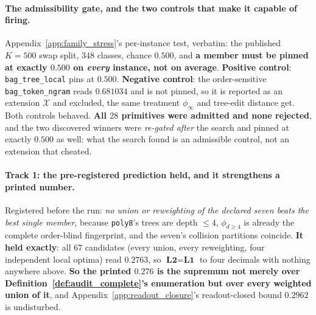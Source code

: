 \paragraph{The admissibility gate, and the two controls that make it capable of firing.} Appendix~\ref{app:family_stress}'s per-instance test, verbatim: the published $K{=}500$ swap split, $348$ classes, chance $0.500$, and \textbf{a member must be pinned at exactly $0.500$ on \emph{every} instance, not on average}. \textbf{Positive control}: \texttt{bag\_tree\_local} pins at $0.500$. \textbf{Negative control}: the order-sensitive \texttt{bag\_token\_ngram} reads $0.681034$ and is not pinned, so it is reported as an extension $\mathcal{X}$ and excluded, the same treatment $\phi_\infty$ and tree-edit distance get. Both controls behaved. \textbf{All $28$ primitives were admitted and none rejected}, and the two discovered winners were \emph{re-gated after} the search and pinned at exactly $0.500$ as well: what the search found is an admissible control, not an extension that cheated.

\paragraph{Track 1: the pre-registered prediction held, and it strengthens a printed number.} Registered before the run: \emph{no union or reweighting of the declared seven beats the best single member}, because \texttt{poly8}'s trees are depth ${\leq}4$, $\phi_{d\geq4}$ is already the complete order-blind fingerprint, and the seven's collision partitions coincide. \textbf{It held exactly}: all $67$ candidates (every union, every reweighting, four independent local optima) read $\mathbf{0.2763}$, so $\textbf{L2}=\textbf{L1}$ to four decimals with nothing anywhere above. \textbf{So the printed $0.276$ is the supremum not merely over Definition~\ref{def:audit_complete}'s enumeration but over every weighted union of it}, and Appendix~\ref{app:readout_closure}'s readout-closed bound $0.2962$ is undisturbed.

